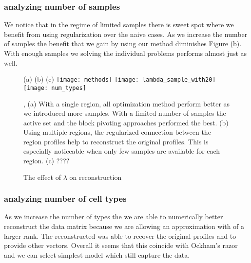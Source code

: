 \subsubsection*{analyzing number of samples}
We notice that in the regime of limited samples there is sweet spot where we benefit from using regularization over the naive cases. As we increase the number of samples the benefit that we gain by using our method diminishes Figure \label{fig:controlled_exp}(b). With enough samples we solving the individual problems performs almost just as well. 



\begin{figure}[!hbt]
   (a) \hspace{120pt}(b) \hspace{120pt}(c) \hspace{120pt}
   \centering
     \texttt{[image: methods]}
     \texttt{[image: lambda\_sample\_with20]}
     \texttt{[image: num\_types]}
    \caption{The effect of $\lambda$ on reconstruction}, 
    (a)  With a single region, all optimization method perform better as we introduced more samples. With a limited number of samples the active set and the block pivoting approaches performed the best. (b) Using multiple regions, the regularized connection between the region profiles help to reconstruct the original profiles. This is especially noticeable when only few samples are available for each region. (c) ????
    \label{fig:controlled_exp}
\end{figure}




\subsubsection*{analyzing number of cell types}

As we increase the number of types the we are able to numerically better reconstruct the data matrix because we are allowing an approximation with of a larger rank. The reconstructed was able to recover the original profiles and to provide other vectors. Overall it seems that this coincide with Ockham's razor and we can select simplest model which still capture the data. 



